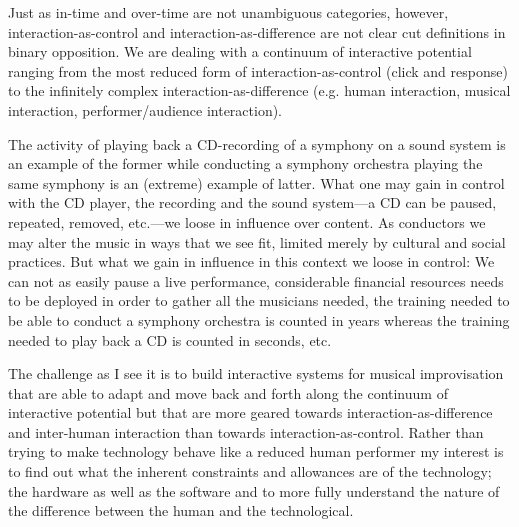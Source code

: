 \documentclass{article}
\begin{document}



Just as in-time and over-time are not unambiguous categories, however, interaction-as-control and interaction-as-difference are not clear cut definitions in binary opposition. We are dealing with a continuum of interactive potential ranging from the most reduced form of interaction-as-control (click and response) to the infinitely complex interaction-as-difference (e.g. human interaction, musical interaction, performer/audience interaction). 

The activity of playing back a CD-recording of a symphony on a sound system is an example of the former while conducting a symphony orchestra playing the same symphony is an (extreme) example of latter. What one may gain in control with the CD player, the recording and the sound system---a CD can be paused, repeated, removed, etc.---we loose in influence over content. 
As conductors we may alter the music in ways that we see fit, limited merely by cultural and social practices. But what we gain in influence in this context we loose in control: We can not as easily pause a live performance, considerable financial resources needs to be deployed in order to gather all the musicians needed, the training needed to be able to conduct a symphony orchestra is counted in years whereas the training needed to play back a CD is counted in seconds, etc. 

The challenge as I see it is to build interactive systems for musical improvisation that are able to adapt and move back and forth along the continuum of interactive potential but that are more geared towards interaction-as-difference and inter-human interaction than towards interaction-as-control. Rather than trying to make technology behave like a reduced human performer my interest is to find out what the inherent constraints and allowances are of the technology; the hardware as well as the software and to more fully understand the nature of the difference between the human and the technological.
\end{document}

